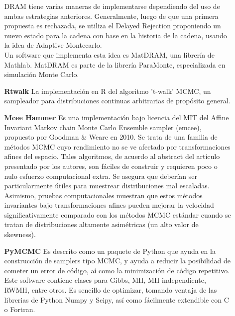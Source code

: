 \documentclass[letterpaper]{article}
\newcommand{\1}{\mathds{1}}
\theoremstyle{definition}
\theoremstyle{definition}
\theoremstyle{definition}
\theoremstyle{definition}
\theoremstyle{definition}
\begin{document}
\begin{itemize}
\begin{enumerate}
        DRAM tiene varias maneras de implementarse dependiendo del uso de ambas estrategias anteriores. Generalmente, luego de que una primera propuesta es rechazada, 
        se utiliza el Delayed Rejection proponiendo un nuevo estado para la cadena con base en la historia de la cadena, usando la idea de Adaptive Montecarlo.\\

        Un software que implementa esta idea es MatDRAM, una librería de Mathlab. MatDRAM es parte de la librería ParaMonte, especializada en simulación Monte Carlo.
        \item[\textbf{Rtwalk}] La implementación en R del algoritmo 't-walk' MCMC, un sampleador para distribuciones continuas arbitrarias de propósito general.
        \item[\textbf{Mcee Hammer}] Es una implementación bajo licencia del MIT del Affine Invariant Markov chain Monte Carlo Ensemble sampler (emcee), propuesto 
        por Goodman \& Weare en 2010. Se trata de una familia de métodos MCMC cuyo rendimiento no se 
        ve afectado por transformaciones afines del espacio. Tales algoritmos, de acuerdo al abstract 
        del artículo presentado por los autores, son fáciles de construir y requieren poco o nulo esfuerzo computacional extra.
        Se asegura que deberían ser particularmente útiles para muestrear distribuciones mal escaladas. Asimismo,
        pruebas computacionales muestran que estos métodos invariantes bajo transformaciones afines 
        pueden mejorar la velocidad significativamente comparado con los métodos MCMC estándar cuando
        se tratan de distribuciones altamente asimétricas (un alto valor de skewness).
        \item[\textbf{PyMCMC}] Es descrito como un paquete de Python que ayuda en la construcción de samplers tipo MCMC, y ayuda a reducir la
        posibilidad de cometer un error de código, aí como la minimización de código repetitivo. Este software contiene clases para Gibbs, MH, MH independiente, RWMH,
        entre otros. Es sencillo de optimizar, tomando ventaja de las librerias de Python Numpy y Scipy, así como fácilmente extendible con C o Fortran. 
    \end{enumerate}
\end{itemize}
\end{document}
